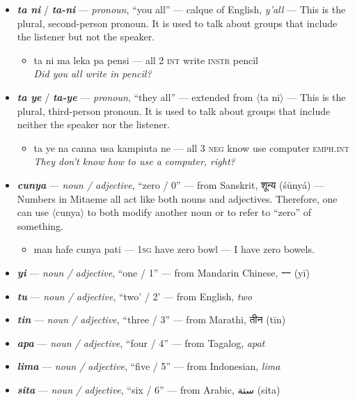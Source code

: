 \documentclass[a4paper, titlepage]{article}
\begin{document}
\begin{itemize}
\begin{itemize}
	\end{itemize}
	\item \textbf{\textit{ta ni}}  / \textbf{\textit{ta-ni}} — \textit{pronoun}, ``you all'' — calque of English, \textit{y'all} — This is the plural, second-person pronoun. It is used to talk about groups that include the listener but not the speaker.
	\begin{itemize}
		\item ta ni ma leka pa pensi — all 2 \textsc{int} write \textsc{instr} pencil \\\textit{Did you all write in pencil?}
	\end{itemize}
	\item \textbf{\textit{ta ye}}  / \textbf{\textit{ta-ye}} — \textit{pronoun}, ``they all'' — extended from $\langle$ta ni$\rangle$ — This is the plural, third-person pronoun. It is used to talk about groups that include neither the speaker nor the listener.
	\begin{itemize}
		\item ta ye na canna usa kampiuta ne — all 3 \textsc{neg} know use computer \textsc{emph.int} \\\textit{They don't know how to use a computer, right?}
	\end{itemize}
	\item \textbf{\textit{cunya}} —  \textit{noun / adjective}, ``zero / 0'' — from Sanskrit, {\hmfont शून्य} (śūnyá) — Numbers in Mitaeme all act like both nouns and adjectives. Therefore, one can use $\langle$cunya$\rangle$ to both modify another noun or to refer to ``zero'' of something.
	\begin{itemize}
		\item man hafe cunya pati — \textsc{1sg} have zero bowl — I have zero bowels.
	\end{itemize}
	\item \textbf{\textit{yi}} —  \textit{noun / adjective}, ``one / 1'' — from Mandarin Chinese, 一 (yī)
	\item \textbf{\textit{tu}} —  \textit{noun / adjective}, ``two' / 2' — from English, \textit{two}
	\item \textbf{\textit{tin}} —  \textit{noun / adjective}, ``three / 3'' — from Marathi, {\hmfont तीन} (tīn)
	\item \textbf{\textit{apa}} —  \textit{noun / adjective}, ``four / 4'' — from Tagalog, \textit{apat}
	\item \textbf{\textit{lima}} —  \textit{noun / adjective}, ``five / 5'' — from Indonesian, \textit{lima}
	\item \textbf{\textit{sita}} —  \textit{noun / adjective}, ``six / 6'' — from Arabic, {\afont  ستة } (sita)

\end{itemize}
\end{document}
